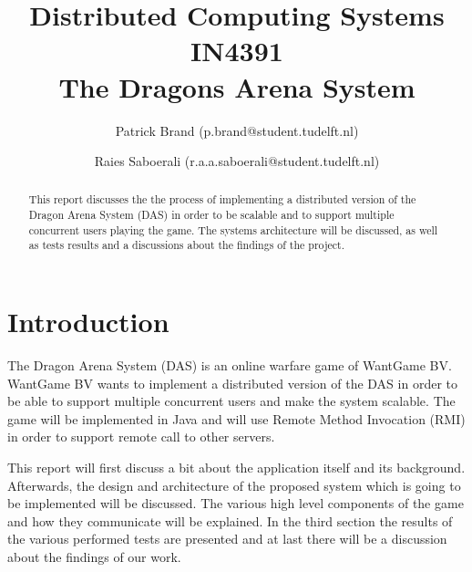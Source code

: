 \documentclass{article}
\title{Distributed Computing Systems IN4391\\ The Dragons Arena System %
}
\author{Patrick Brand (p.brand@student.tudelft.nl) \and
    Raies Saboerali (r.a.a.saboerali@student.tudelft.nl)}
\date{}
\begin{document}
\maketitle
\thispagestyle{empty}

\begin{abstract}
This report discusses the the process of implementing a distributed version of the Dragon Arena System (DAS) in order to be scalable and to support multiple concurrent users playing the game.
The systems architecture will be discussed, as well as tests results and a discussions about the findings of the project.
\end{abstract}


\section{Introduction}

The Dragon Arena System (DAS) is an online warfare game of WantGame BV.
WantGame BV wants to implement a distributed version of the DAS in order to be able to support multiple concurrent users and make the system scalable.
The game will be implemented in Java and will use Remote Method Invocation (RMI) in order to support remote call to other servers.

This report will first discuss a bit about the application itself and its background.
Afterwards, the design and architecture of the proposed system which is going to be implemented will be discussed. 
The various high level components of the game and how they communicate will be explained.
In the third section the results of the various performed tests are presented and at last there will be a discussion about the findings of our work.

\newpage









  



\nocite{*}


\end{document}
